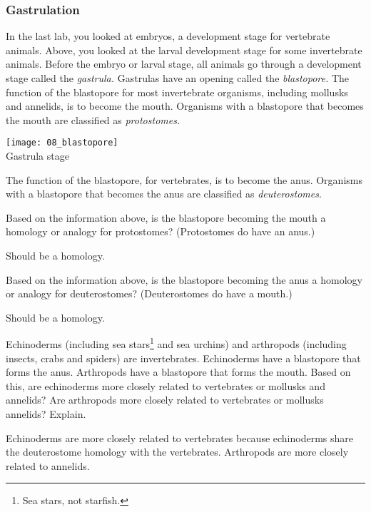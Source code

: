 \documentclass[12pt, hidelinks]{exam}
\newcommand*\AnswerBox[2]{%
    \parbox[t][#1]{0.92\textwidth}{%
    \begin{solution}#2\end{solution}}
    \vspace{\stretch{1}}
}
\begin{document}
\begin{questions}
\subsubsection*{Gastrulation}

\begin{minipage}{0.75\textwidth}%
In the last lab, you looked at embryos, a development stage for
vertebrate animals. Above, you looked at the larval development
stage for some invertebrate animals. Before the embryo or larval stage, all 
animals go through a development stage called the \emph{gastrula.}  
Gastrulas have an opening called the \emph{blastopore.} The function of the blastopore 
 for most invertebrate organisms, including mollusks and annelids, is to become the mouth.
 Organisms with a blastopore that
 becomes the mouth are classified as \emph{protostomes.} 
\end{minipage}\hfill
\begin{minipage}{0.25\textwidth}%
\centering\texttt{[image: 08\_blastopore]}\\%
{\footnotesize Gastrula stage}%
\end{minipage}

The function of the blastopore, for vertebrates, is to become the anus.  Organisms with a blastopore that becomes
the anus are classified as \emph{deuterostomes}. 

\newpage

\question
Based on the information above, is the blastopore becoming the mouth a 
homology or analogy for protostomes? (Protostomes do have an anus.)

\AnswerBox{3\baselineskip}{Should be a homology.}

\question
Based on the information above, is the blastopore becoming the anus a 
homology or analogy for deuterostomes? (Deuterostomes do have a mouth.)

\AnswerBox{3\baselineskip}{Should be a homology.}

\question
Echinoderms (including sea stars\footnote{Sea stars, not starfish.} and sea urchins) 
and arthropods (including insects, crabs and spiders) are invertebrates. 
Echinoderms have a blastopore that forms the anus. 
Arthropods have a blastopore that forms the mouth.
Based on this, are echinoderms more closely related to vertebrates
or mollusks and annelids? Are arthropods more closely related to vertebrates or mollusks 
annelids? Explain.

\AnswerBox{4\baselineskip}{Echinoderms are more closely related to vertebrates because
echinoderms share the deuterostome homology with the vertebrates. Arthropods are more closely related to annelids.}


\end{questions}
\end{document}
